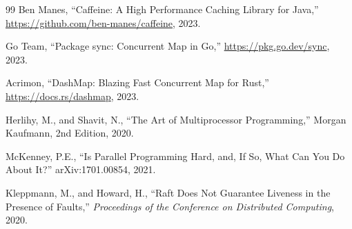 \documentclass[12pt,a4paper]{report}
\begin{document}
\begin{thebibliography}{99}
    Ben Manes,
    ``Caffeine: A High Performance Caching Library for Java,''
    \url{https://github.com/ben-manes/caffeine}, 2023.

    Go Team,
    ``Package sync: Concurrent Map in Go,''
    \url{https://pkg.go.dev/sync}, 2023.

    Acrimon,
    ``DashMap: Blazing Fast Concurrent Map for Rust,''
    \url{https://docs.rs/dashmap}, 2023.

    Herlihy, M., and Shavit, N.,
    ``The Art of Multiprocessor Programming,''
    Morgan Kaufmann, 2nd Edition, 2020.

    McKenney, P.E.,
    ``Is Parallel Programming Hard, and, If So, What Can You Do About It?''
    arXiv:1701.00854, 2021.

    Kleppmann, M., and Howard, H.,
    ``Raft Does Not Guarantee Liveness in the Presence of Faults,'' 
    \textit{Proceedings of the Conference on Distributed Computing}, 2020.
\end{thebibliography}
\end{document}
